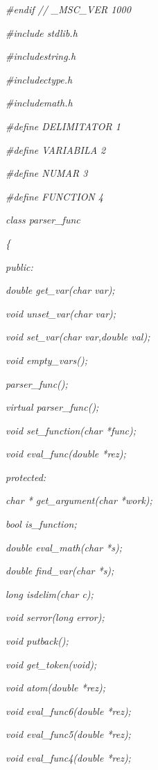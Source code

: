 \documentclass[a4paper,twoside]{book}
\begin{document}
\textit{\#endif // \_MSC\_VER \TEXTsymbol{>} 1000}

\textit{\#include \TEXTsymbol{<}stdlib.h\TEXTsymbol{>}}

\textit{\#include\TEXTsymbol{<}string.h\TEXTsymbol{>}}

\textit{\#include\TEXTsymbol{<}ctype.h\TEXTsymbol{>}}

\textit{\#include\TEXTsymbol{<}math.h\TEXTsymbol{>}}

\textit{\#define DELIMITATOR 1}

\textit{\#define VARIABILA 2}

\textit{\#define NUMAR 3}

\textit{\#define FUNCTION 4}

\textit{class parser\_func }

\textit{\{}

\textit{public:}

\textit{\qquad double get\_var(char var);}

\textit{\qquad void unset\_var(char var);}

\textit{\qquad void set\_var(char var,double val);}

\textit{\qquad void empty\_vars();}

\textit{\qquad parser\_func();}

\textit{\qquad virtual parser\_func();}

\textit{\qquad void set\_function(char *func);}

\textit{\qquad void eval\_func(double *rez);}

\textit{protected:}

\textit{\qquad char * get\_argument(char *work);}

\textit{\qquad bool is\_function;}

\textit{\qquad double eval\_math(char *s);}

\textit{\qquad double find\_var(char *s);}

\textit{\qquad long isdelim(char c);}

\textit{\qquad void serror(long error);}

\textit{\qquad void putback();}

\textit{\qquad void get\_token(void);}

\textit{\qquad void atom(double *rez);}

\textit{\qquad void eval\_func6(double *rez);}

\textit{\qquad void eval\_func5(double *rez);}

\textit{\qquad void eval\_func4(double *rez);}
\end{document}
